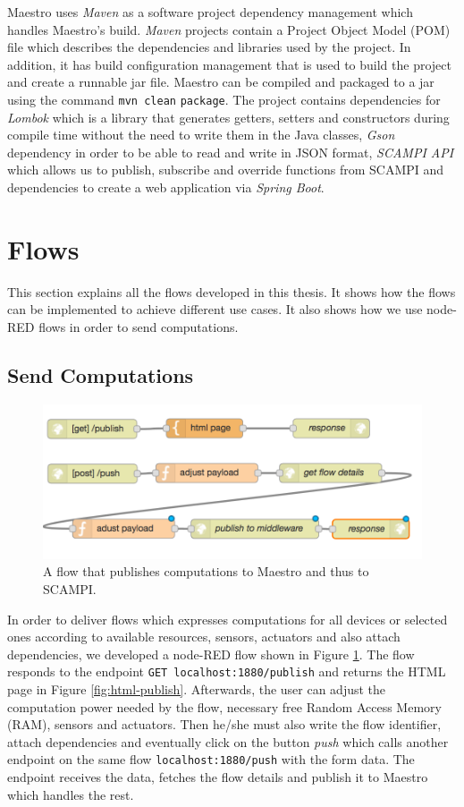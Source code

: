 \noindent Maestro uses \textit{Maven} as a  software project dependency management which handles Maestro's build. \textit{Maven} projects contain a Project Object Model (POM) file which describes the dependencies and libraries used by the project. In addition, it has build configuration management that is used to build the project and create a runnable jar file. Maestro can be compiled and packaged to a jar using the command \verb|mvn clean| \verb|package|. The project contains dependencies for \textit{Lombok} which is a library that generates getters, setters and constructors during compile time without the need to write them in the Java classes, \textit{Gson} dependency in order to be able to read and write in JSON format, \textit{SCAMPI API} which allows us to publish, subscribe and override  functions from SCAMPI and dependencies to create a web application via \textit{Spring Boot}. \\

\section{Flows}
This section explains all the flows developed in this thesis. It shows how the flows can be implemented to achieve different use cases. It also shows how we use node-RED flows in order to send computations.
\subsection{Send Computations}\label{subsec:send-comp}
 \begin{figure}[H]
	\centering
	\includegraphics[scale=0.6]{images/flow-publish-computation.png}
	\caption{A flow that publishes computations to Maestro and thus to SCAMPI.}
	\label{fig:flow-publish-computation}
	
\end{figure}

In order to deliver flows which expresses computations for all devices or selected ones according to available resources,  sensors, actuators and also attach dependencies, we developed a node-RED flow shown in Figure \ref{fig:flow-publish-computation}. The flow responds to the endpoint \verb|GET localhost:1880/publish| and returns the HTML page in Figure \ref{fig:html-publish}. Afterwards, the user can adjust the computation power needed by the flow, necessary free Random Access Memory (RAM), sensors and actuators. Then he/she must also write the flow identifier, attach dependencies and eventually click on the button \textit{push} which calls another endpoint on the same flow \verb|localhost:1880/push| with the form data. The endpoint receives the data, fetches the flow details and publish it to  Maestro which handles the rest.


